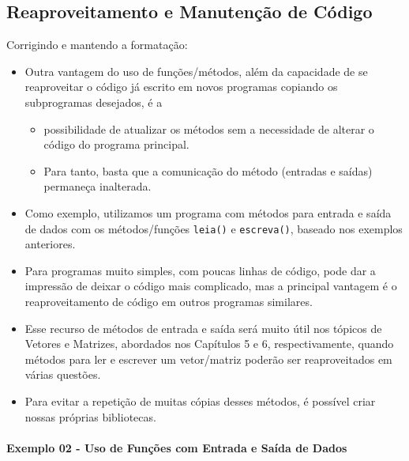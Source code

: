 \documentclass[12pt,a4paper]{article}
\providecommand{\tightlist}{%
      \setlength{\itemsep}{0pt}\setlength{\parskip}{0pt}}
\begin{document}
    \hypertarget{reaproveitamento-e-manutenuxe7uxe3o-de-cuxf3digo}{%
\subsection{Reaproveitamento e Manutenção de
Código}\label{reaproveitamento-e-manutenuxe7uxe3o-de-cuxf3digo}}

    Corrigindo e mantendo a formatação:

\begin{itemize}
\item
  Outra vantagem do uso de funções/métodos, além da capacidade de se
  reaproveitar o código já escrito em novos programas copiando os
  subprogramas desejados, é a

  \begin{itemize}
  \tightlist
  \item
    possibilidade de atualizar os métodos sem a necessidade de alterar o
    código do programa principal.
  \item
    Para tanto, basta que a comunicação do método (entradas e saídas)
    permaneça inalterada.
  \end{itemize}
\item
  Como exemplo, utilizamos um programa com métodos para entrada e saída
  de dados com os métodos/funções \texttt{leia()} e \texttt{escreva()},
  baseado nos exemplos anteriores.
\item
  Para programas muito simples, com poucas linhas de código, pode dar a
  impressão de deixar o código mais complicado, mas a principal vantagem
  é o reaproveitamento de código em outros programas similares.
\item
  Esse recurso de métodos de entrada e saída será muito útil nos tópicos
  de Vetores e Matrizes, abordados nos Capítulos 5 e 6, respectivamente,
  quando métodos para ler e escrever um vetor/matriz poderão ser
  reaproveitados em várias questões.
\item
  Para evitar a repetição de muitas cópias desses métodos, é possível
  criar nossas próprias bibliotecas.
\end{itemize}

    \hypertarget{exemplo-02---uso-de-funuxe7uxf5es-com-entrada-e-sauxedda-de-dados}{%
\paragraph{Exemplo 02 - Uso de Funções com Entrada e Saída de
Dados}\label{exemplo-02---uso-de-funuxe7uxf5es-com-entrada-e-sauxedda-de-dados}}
\end{document}

